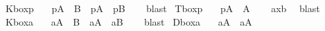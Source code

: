 \begin{isabellebody}
\ K{\isacharunderscore}boxp{\isacharcolon}\isanewline
\ \ \ {\isachardoublequoteopen}{\isasymTurnstile}{\isacharparenleft}{\isacharparenleft}{\isasymbox}\isactrlsub p{\isacharparenleft}A\ \isactrlbold {\isasymrightarrow}\ B{\isacharparenright}{\isacharparenright}\ \isactrlbold {\isasymrightarrow}\ {\isacharparenleft}{\isacharparenleft}{\isasymbox}\isactrlsub pA{\isacharparenright}\ \isactrlbold {\isasymrightarrow}\ {\isacharparenleft}{\isasymbox}\isactrlsub pB{\isacharparenright}{\isacharparenright}{\isacharparenright}{\isachardoublequoteclose}\isanewline
%
\isadelimproof
\ \ %
\endisadelimproof
%
\isatagproof
{}\isamarkupfalse%
\ blast%
\endisatagproof
{\isafoldproof}%
%
\isadelimproof
\isanewline
%
\endisadelimproof
{}\isamarkupfalse%
\ T{\isacharunderscore}boxp{\isacharcolon}\isanewline
\ \ \ {\isachardoublequoteopen}{\isasymTurnstile}{\isacharparenleft}{\isacharparenleft}{\isasymbox}\isactrlsub pA{\isacharparenright}\ \isactrlbold {\isasymrightarrow}\ A{\isacharparenright}{\isachardoublequoteclose}\isanewline
%
\isadelimproof
\ \ %
\endisadelimproof
%
\isatagproof
{}\isamarkupfalse%
\ ax{\isacharunderscore}{}b\ \isamarkupfalse%
\ blast%
\endisatagproof
{\isafoldproof}%
%
\isadelimproof
%
\endisadelimproof
%
\isadelimdocument
%
\endisadelimdocument
%
\isatagdocument
%
\isamarkuptrue%
%
%
\endisatagdocument
{\isafolddocument}%
%
\isadelimdocument
\isanewline
%
\endisadelimdocument
{}\isamarkupfalse%
\ K{\isacharunderscore}boxa{\isacharcolon}\isanewline
\ \ \ {\isachardoublequoteopen}{\isasymTurnstile}{\isacharparenleft}{\isacharparenleft}{\isasymbox}\isactrlsub a{\isacharparenleft}A\ \isactrlbold {\isasymrightarrow}\ B{\isacharparenright}{\isacharparenright}\ \isactrlbold {\isasymrightarrow}\ {\isacharparenleft}{\isacharparenleft}{\isasymbox}\isactrlsub aA{\isacharparenright}\ \isactrlbold {\isasymrightarrow}\ {\isacharparenleft}{\isasymbox}\isactrlsub aB{\isacharparenright}{\isacharparenright}{\isacharparenright}{\isachardoublequoteclose}\isanewline
%
\isadelimproof
\ \ %
\endisadelimproof
%
\isatagproof
{}\isamarkupfalse%
\ blast%
\endisatagproof
{\isafoldproof}%
%
\isadelimproof
\isanewline
%
\endisadelimproof
{}\isamarkupfalse%
\ D{\isacharunderscore}boxa{\isacharcolon}\isanewline
\ \ \ {\isachardoublequoteopen}{\isasymTurnstile}{\isacharparenleft}{\isacharparenleft}{\isasymbox}\isactrlsub aA{\isacharparenright}\ \isactrlbold {\isasymrightarrow}\ {\isacharparenleft}{\isasymdiamond}\isactrlsub aA{\isacharparenright}{\isacharparenright}{\isachardoublequoteclose}\isanewline

\end{isabellebody}

